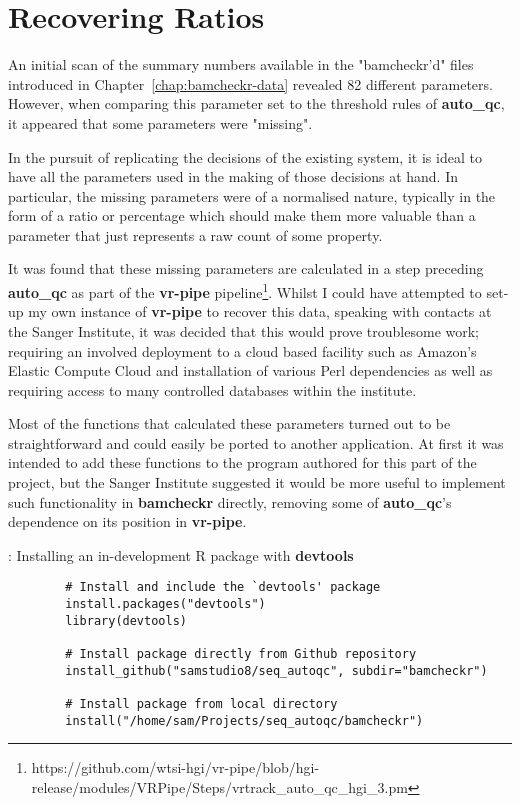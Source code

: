 \section{Recovering Ratios}
\label{app:ratios}

An initial scan of the summary numbers available in the "bamcheckr'd" files
introduced in Chapter~\ref{chap:bamcheckr-data} revealed 82 different
parameters. However, when comparing this parameter set to the threshold rules of
\textbf{auto\_qc}, it appeared that some parameters were "missing".

In the pursuit of replicating the decisions of the
existing system, it is ideal to have all the parameters used in the making of
those decisions at hand. In particular, the missing parameters were of a
normalised nature, typically in the form of a ratio or percentage which should
make them more valuable than a parameter that just represents a raw count of
some property.

It was found that these missing parameters are calculated in a step preceding
\textbf{auto\_qc} as part of the \textbf{vr-pipe}
pipeline\footnote{https://github.com/wtsi-hgi/vr-pipe/blob/hgi-release/modules/VRPipe/Steps/vrtrack\_auto\_qc\_hgi\_3.pm}.
Whilst I could have attempted to set-up my own instance of \textbf{vr-pipe} to
recover this data, speaking with contacts at the Sanger Institute, it was
decided that this would prove troublesome work; requiring an involved
deployment to a cloud based facility such as Amazon's Elastic Compute Cloud and
installation of various Perl dependencies as well as requiring access to many
controlled databases within the institute.

Most of the functions that calculated these parameters turned out to be
straightforward and could easily be ported to another application. At first
it was intended to add these functions to the program authored for this part of
the project, but the Sanger Institute suggested it would be more useful to
implement such functionality in \textbf{bamcheckr} directly, removing some of
\textbf{auto\_qc}'s dependence on its position in \textbf{vr-pipe}.

\begin{listing}[H]
    \caption[r-dev]{: Installing an in-development R package with \textbf{devtools}}
    \label{list:r-dev}
    \begin{verbatim}
        # Install and include the `devtools' package
        install.packages("devtools")
        library(devtools)

        # Install package directly from Github repository
        install_github("samstudio8/seq_autoqc", subdir="bamcheckr")

        # Install package from local directory
        install("/home/sam/Projects/seq_autoqc/bamcheckr")

    \end{verbatim}
\end{listing}

